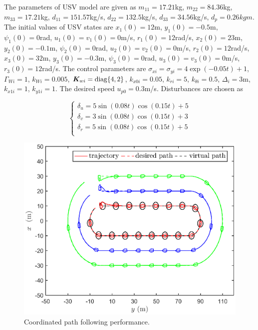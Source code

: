 \documentclass[conference,letterpaper,10.5pt]{IEEEtran}
\begin{document}
The parameters of USV model are given as $m_{11}=17.21$kg, $m_{22}=84.36$kg, $m_{33}=17.21$kg, $d_{11}=151.57$kg/s, $d_{22}=132.5$kg/s, $d_{33}=34.56$kg/s, $d_p=0.26kgm$. The initial values of USV states are $x_1(0)=12$m, $y_1(0)=-0.5$m, $\psi_1(0)=0$rad, $u_1(0)=v_1(0)=0$m/s, $r_1(0)=12$rad/s, $x_2(0)=23$m, $y_2(0)=-0.1$m, $\psi_2(0)=0$rad, $u_2(0)=v_2(0)=0$m/s, $r_2(0)=12$rad/s, $x_3(0)=32$m, $y_3(0)=-0.3$m, $\psi_3(0)=0$rad, $u_3(0)=v_3(0)=0$m/s, $r_3(0)=12$rad/s. The control parameters are $\sigma_{xi}=\sigma_{yi}=4\exp(-0.05t)+1$, $\Gamma_{Wi}=1$, $k_{Wi}=0.005$, $\bm{K}_{wi}={\rm diag}\{4,2\}$, $k_{x0i}=0.05$, $k_{ri}=5$, $k_{\theta i}=0.5$, $\Delta_i=3$m, $k_{x1i}=1$, $k_{y1i}=1$. The desired speed $u_{p0}=0.3$m/s. Disturbances are chosen as

\begin{equation}
	\left\{
	\begin{aligned}
		\delta_{u}=5\sin(0.08t)\cos(0.15t)+5\\
		\delta_{v}=3\sin(0.08t)\cos(0.15t)+3\\
		\delta_{r}=5\sin(0.08t)\cos(0.15t)+5\\
	\end{aligned}
	\right.
\end{equation}

\begin{figure}[!htb]
	\centering
	\includegraphics[width=\hsize]{map.eps}
	\caption{Coordinated path following performance.}
	\label{performance}
\end{figure}
\end{document}
